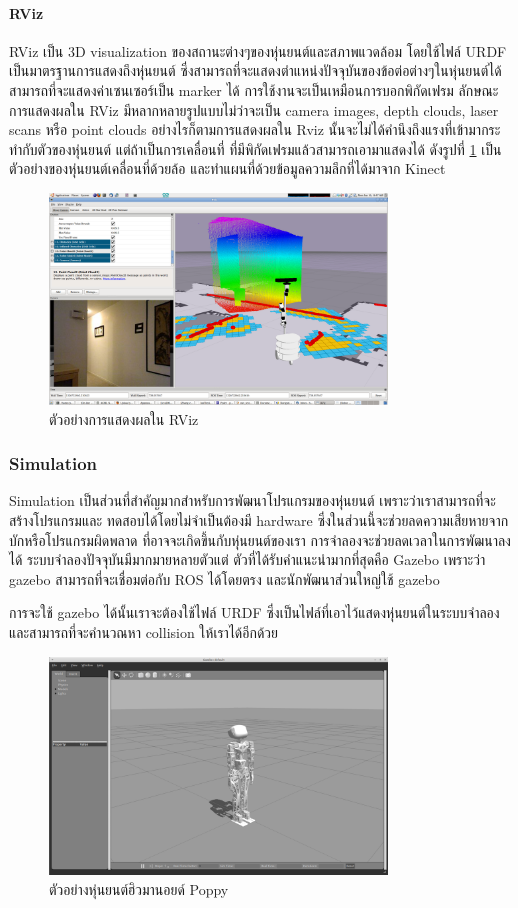 \paragraph*{RViz}
RViz เป็น 3D visualization ของสถานะต่างๆของหุ่นยนต์และสภาพแวดล้อม โดยใช้ไฟล์ URDF เป็นมาตรฐานการแสดงถึงหุ่นยนต์
ซึ่งสามารถที่จะแสดงตำแหน่งปัจจุบันของข้อต่อต่างๆในหุ่นยนต์ได้ สามารถที่จะแสดงค่าเซนเซอร์เป็น marker ได้
การใช้งานจะเป็นเหมือนการบอกพิกัดเฟรม ลักษณะการแสดงผลใน RViz มีหลากหลายรูปแบบไม่ว่าจะเป็น
camera images, depth clouds, laser scans หรือ point clouds อย่างไรก็ตามการแสดงผลใน Rviz
นั้นจะไม่ได้คำนึงถึงแรงที่เข้ามากระทำกับตัวของหุ่นยนต์ แต่ถ้าเป็นการเคลื่อนที่ ที่มีพิกัดเฟรมแล้วสามารถเอามาแสดงได้
ดังรูปที่ \ref{fig:example_visualization_rviz} เป็นตัวอย่างของหุ่นยนต์เคลื่อนที่ด้วยล้อ และทำแผนที่ด้วยข้อมูลความลึกที่ได้มาจาก Kinect

\clearpage
\begin{figure}[!ht]
    \centering
    \includegraphics[width=0.8\textwidth]{chapter2/images/nav_test_rviz_2.png}
	\caption{ตัวอย่างการแสดงผลใน RViz}
    \label{fig:example_visualization_rviz}
\end{figure}

\subsubsection*{Simulation}
Simulation เป็นส่วนที่สำคัญมากสำหรับการพัฒนาโปรแกรมของหุ่นยนต์ เพราะว่าเราสามารถที่จะสร้างโปรแกรมและ
ทดสอบได้โดยไม่จำเป็นต้องมี hardware ซึ่งในส่วนนี้จะช่วยลดความเสียหายจากบักหรือโปรแกรมผิดพลาด ที่อาจจะเกิดขึ้นกับหุ่นยนต์ของเรา 
การจำลองจะช่วยลดเวลาในการพัฒนาลงได้ ระบบจำลองปัจจุบันมีมากมายหลายตัวแต่ ตัวที่ได้รับคำแนะนำมากที่สุดคือ Gazebo
เพราะว่า gazebo สามารถที่จะเชื่อมต่อกับ ROS ได้โดยตรง และนักพัฒนาส่วนใหญ่ใช้ gazebo

การจะใช้ gazebo ได้นั้นเราจะต้องใช้ไฟล์ URDF ซึ่งเป็นไฟล์ที่เอาไว้แสดงหุ่นยนต์ในระบบจำลอง และสามารถที่จะคำนวณหา collision
ให้เราได้อีกด้วย

\begin{figure}[!ht]
    \centering
    \includegraphics[width=0.8\textwidth]{chapter2/images/gazebo_poppy.png}
	\caption{ตัวอย่างหุ่นยนต์ฮิวมานอยด์ Poppy}
    \label{fig:gazebo_poppy}
\end{figure}

